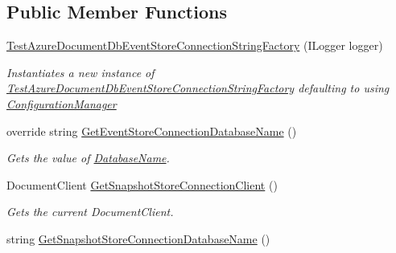 \subsection*{Public Member Functions}
\begin{DoxyCompactItemize}
\item 
\hyperlink{classCqrs_1_1Ninject_1_1Azure_1_1DocumentDb_1_1Events_1_1TestAzureDocumentDbEventStoreConnectionStringFactory_ab9c02577f0f7b3b43d5d4d53a9755894_ab9c02577f0f7b3b43d5d4d53a9755894}{Test\+Azure\+Document\+Db\+Event\+Store\+Connection\+String\+Factory} (I\+Logger logger)
\begin{DoxyCompactList}\small\item\em Instantiates a new instance of \hyperlink{classCqrs_1_1Ninject_1_1Azure_1_1DocumentDb_1_1Events_1_1TestAzureDocumentDbEventStoreConnectionStringFactory}{Test\+Azure\+Document\+Db\+Event\+Store\+Connection\+String\+Factory} defaulting to using \hyperlink{classCqrs_1_1Azure_1_1DocumentDb_1_1Events_1_1AzureDocumentDbEventStoreConnectionStringFactory_a17abd52e82be8c2dea8f5ef5edb53b85_a17abd52e82be8c2dea8f5ef5edb53b85}{Configuration\+Manager} \end{DoxyCompactList}\item 
override string \hyperlink{classCqrs_1_1Ninject_1_1Azure_1_1DocumentDb_1_1Events_1_1TestAzureDocumentDbEventStoreConnectionStringFactory_a85b4e6cd45d285be6de5db19148118b9_a85b4e6cd45d285be6de5db19148118b9}{Get\+Event\+Store\+Connection\+Database\+Name} ()
\begin{DoxyCompactList}\small\item\em Gets the value of \hyperlink{classCqrs_1_1Ninject_1_1Azure_1_1DocumentDb_1_1Events_1_1TestAzureDocumentDbEventStoreConnectionStringFactory_ad82e2485313ff7802ad125958173f3bf_ad82e2485313ff7802ad125958173f3bf}{Database\+Name}. \end{DoxyCompactList}\item 
Document\+Client \hyperlink{classCqrs_1_1Ninject_1_1Azure_1_1DocumentDb_1_1Events_1_1TestAzureDocumentDbEventStoreConnectionStringFactory_a637c31a89b1514543a736b63f3213eaf_a637c31a89b1514543a736b63f3213eaf}{Get\+Snapshot\+Store\+Connection\+Client} ()
\begin{DoxyCompactList}\small\item\em Gets the current Document\+Client. \end{DoxyCompactList}\item 
string \hyperlink{classCqrs_1_1Ninject_1_1Azure_1_1DocumentDb_1_1Events_1_1TestAzureDocumentDbEventStoreConnectionStringFactory_aaa0c39bc546645fe2f8fc6c5ea9736ec_aaa0c39bc546645fe2f8fc6c5ea9736ec}{Get\+Snapshot\+Store\+Connection\+Database\+Name} ()

\end{DoxyCompactItemize}
